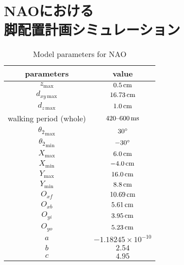 \documentclass[autodetect-engine,dvipdfmx-if-dvi,ja=standard,a4j,jbase=11pt,magstyle=nomag*]{bxjsreport}
\begin{document}
\chapter[NAOにおける脚配置計画シミュレーション]{NAOにおける\\脚配置計画シミュレーション}
\label{chap:sim_nao}

\begin{table}[pt]
    \renewcommand{\arraystretch}{1.0}
    \centering
    \caption{Model parameters for NAO}
    \label{tab:sim_nao_param_model}
    \begin{tabular}{cc}
        \toprule%
        parameters                  &   value \\
        \midrule%
        $z_{\mathrm{max}}$          &   $0.5\,\si{\centi\meter}$ \\
        $d_{xy\,\mathrm{max}}$      &   $16.73\,\si{\centi\meter}$ \\
        $d_{z\,\mathrm{max}}$       &   $1.0\,\si{\centi\meter}$ \\
        walking period (whole)      &   $420\text{--}600\,\si{\milli\second}$ \\
        \midrule%
        ${\theta_2}_{\mathrm{max}}$ &   $30 \degree$ \\
        ${\theta_2}_{\mathrm{min}}$ &   $-30 \degree$ \\
        $X_{\mathrm{max}}$          &   $6.0\,\si{\centi\meter}$ \\
        $X_{\mathrm{min}}$          &   $-4.0\,\si{\centi\meter}$ \\
        $Y_{\mathrm{max}}$          &   $16.0\,\si{\centi\meter}$ \\
        $Y_{\mathrm{min}}$          &   $8.8\,\si{\centi\meter}$ \\
        $O_{xf}$                    &   $10.69\,\si{\centi\meter}$ \\
        $O_{xb}$                    &   $5.61\,\si{\centi\meter}$ \\
        $O_{yi}$                    &   $3.95\,\si{\centi\meter}$ \\
        $O_{yo}$                    &   $5.23\,\si{\centi\meter}$ \\
        $a$                         &   $-1.18245 \times 10^{-10}$ \\
        $b$                         &   $2.54$ \\
        $c$                         &   $4.95$ \\
        \bottomrule
    \end{tabular}
    \renewcommand{\arraystretch}{1.0}
\end{table}
\end{document}

